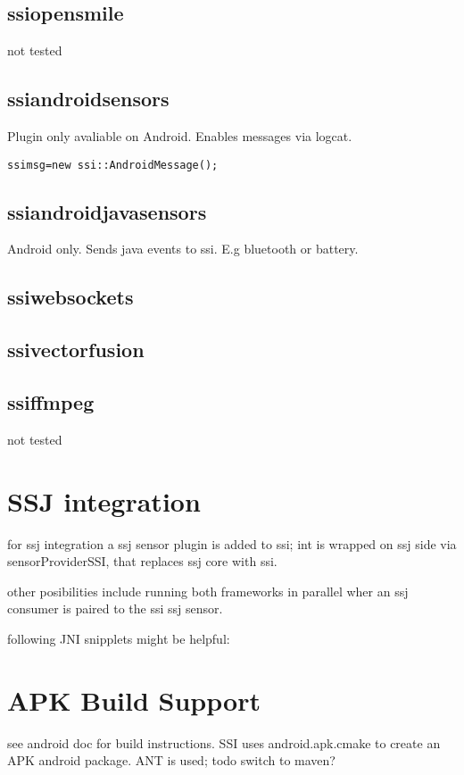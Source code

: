 \documentclass[
10pt, %
a4paper, %
oneside, %
headinclude,footinclude, %
BCOR5mm, %
]{scrartcl}
\begin{document}
\subsection{ssiopensmile}
not tested

\subsection{ssiandroidsensors}

Plugin only avaliable on Android.
Enables messages via logcat.

\verb|ssimsg=new ssi::AndroidMessage();|

\subsection{ssiandroidjavasensors}
Android only. Sends java events to ssi. E.g bluetooth or battery.
\subsection{ssiwebsockets}


\subsection{ssivectorfusion}

\subsection{ssiffmpeg}
not tested


\section{SSJ integration}

for ssj integration a ssj sensor plugin is added to ssi;
int is wrapped on ssj side via sensorProviderSSI, that replaces ssj core with ssi.

other posibilities include running both frameworks in parallel wher an ssj consumer is paired to the ssi ssj sensor.

following JNI snipplets might be helpful:

\section{APK Build Support}

see android doc for build instructions.
SSI uses android.apk.cmake to create an APK android package.
ANT is used; todo switch to maven?
\end{document}
